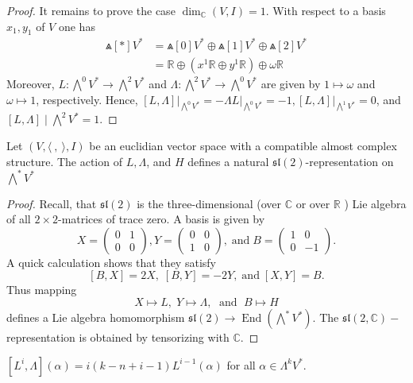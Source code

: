 \begin{proof}
It remains to prove the case $\operatorname{dim}_{\mathbb{C}}(V, I)=1$. With respect to a basis $x_1, y_1$ of $V$ one has
$$
\begin{aligned}
\Wedge[*] V^* & =\Wedge[0] V^* \oplus \Wedge[1] V^* \oplus \Wedge[2] V^* \\
& =\mathbb{R} \oplus\left(x^1 \mathbb{R} \oplus y^1 \mathbb{R}\right) \oplus \omega \mathbb{R}
\end{aligned}
$$
Moreover, $L: \bigwedge^0 V^* \rightarrow \bigwedge^2 V^*$ and $\Lambda: \bigwedge^2 V^* \rightarrow \bigwedge^0 V^*$ are given by $1 \mapsto \omega$ and $\omega \mapsto 1$, respectively. Hence, $\left.[L, \Lambda]\right|_{\bigwedge^{0} V^*}=-\left.\Lambda L\right|_{\bigwedge^{0} V^*}=-1,\left.[L, \Lambda]\right|_{\bigwedge^1 V^*}=0$, and $[L, \Lambda] \mid \bigwedge^2 V^*=1$.
\end{proof}
\begin{corollary}
  Let $(V,\langle~,~\rangle, I) $ be an euclidian vector space with a compatible almost complex structure. The action of $L, \Lambda$, and $H$ defines a natural $\mathfrak{s l}(2)$-representation on $\bigwedge^* V^*$
\end{corollary}
\begin{proof}
  Recall, that $\mathfrak{s l}(2)$ is the three-dimensional (over $\mathbb{C}$ or over $\mathbb{R}$ ) Lie algebra of all $2 \times 2$-matrices of trace zero. A basis is given by 
  \[
  X=\left(\begin{array}{ll}0 & 1 \\ 0 & 0\end{array}\right), Y=\left(\begin{array}{ll}0 & 0 \\ 1 & 0\end{array}\right), \;\text{and}\; B=\left(\begin{array}{cc}1 & 0 \\ 0 & -1\end{array}\right).\]
   A quick calculation shows that they satisfy 
   \[ [B, X]=2 X,\; [B, Y]=-2 Y, \;\text{and}\; [X, Y]=B.\]
    Thus mapping 
    \[X \mapsto L,\;  Y \mapsto \Lambda,\;\text{ and }\; B \mapsto H\]
     defines a Lie algebra homomorphism $\mathfrak{s l}(2) \rightarrow \operatorname{End}\left(\bigwedge^* V^*\right)$. The $\mathfrak{s l}(2, \mathbb{C})-$ representation is obtained by tensorizing with $\mathbb{C}$.
\end{proof}
\begin{corollary}
  $\left[L^i, \Lambda\right](\alpha)=i(k-n+i-1) L^{i-1}(\alpha)$ for all $\alpha \in \Lambda^k V^*$.
\end{corollary}

